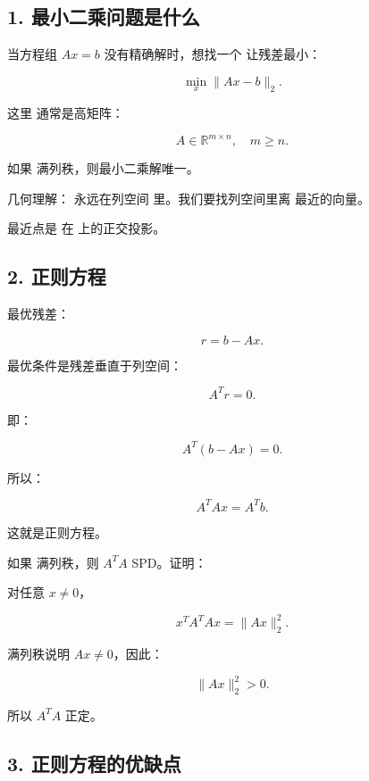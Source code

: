 \documentclass[11pt,a4paper]{ctexart}
\newcommand{\code}[1]{\begingroup\ttfamily\small #1\endgroup}
\begin{document}
\subsection*{1. 最小二乘问题是什么}


当方程组 $Ax=b$ 没有精确解时，想找一个 \code{} 让残差最小：

\[
\min_x \|Ax-b\|_2.
\]

这里 \code{} 通常是高矩阵：

\[
A\in\mathbb R^{m\times n},\quad m\ge n.
\]

如果 \code{} 满列秩，则最小二乘解唯一。

几何理解：\code{} 永远在列空间 \code{} 里。我们要找列空间里离 \code{} 最近的向量。

最近点是 \code{\detokenize{b}} 在 \code{} 上的正交投影。


\subsection*{2. 正则方程}


最优残差：

\[
r=b-Ax.
\]

最优条件是残差垂直于列空间：

\[
A^Tr=0.
\]

即：

\[
A^T(b-Ax)=0.
\]

所以：

\[
A^TAx=A^Tb.
\]

这就是正则方程。

如果 \code{} 满列秩，则 $A^TA$ SPD。证明：

对任意 $x\ne 0$，

\[
x^TA^TAx=\|Ax\|_2^2.
\]

满列秩说明 $Ax\ne 0$，因此：

\[
\|Ax\|_2^2>0.
\]

所以 $A^TA$ 正定。


\subsection*{3. 正则方程的优缺点}
\end{document}
